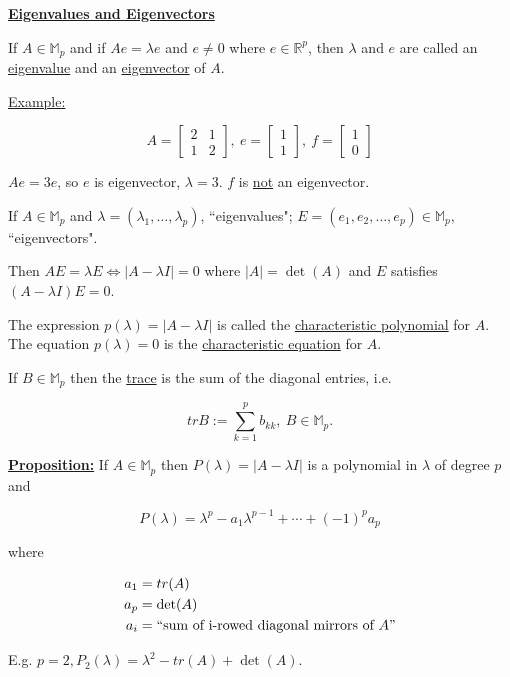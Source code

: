 \documentclass[twoside]{article}
\begin{document}
\textbf{\underline{Eigenvalues and Eigenvectors}}

If $A\in\mathbb{M}_p$ and if $Ae=\lambda e$ and $e\not=0$ where $e\in\mathbb{R}^p$, then $\lambda$ and $e$ are called an \underline{eigenvalue} and an \underline{eigenvector} of $A$.

\underline{Example:}

$$A=\begin{bmatrix}
	2 & 1\\
	1 & 2
\end{bmatrix},\ e=\begin{bmatrix}
	1\\
	1
\end{bmatrix},\ f=\begin{bmatrix}
	1\\
	0
\end{bmatrix}$$

$Ae=3e$, so $e$ is eigenvector, $\lambda=3$. $f$ is \underline{not} an eigenvector.

If $A\in\mathbb{M}_p$ and $\lambda=(\lambda_1,\dots, \lambda_p)$, ``eigenvalues"; $E=(e_1,e_2,\dots,e_p)\in\mathbb{M}_p$, ``eigenvectors".

Then $AE=\lambda E\iff \lvert A-\lambda I\rvert = 0$ where $|A|=\det(A)$ and $E$ satisfies $(A-\lambda I)E=0$.

The expression $p(\lambda)=\lvert A-\lambda I\rvert$ is called the \underline{characteristic polynomial} for $A$. The equation $p(\lambda)=0$ is the \underline{characteristic equation} for $A$.

If $B\in\mathbb{M}_p$ then the \underline{trace} is the sum of the diagonal entries, i.e.

$$tr{B}:=\sum^p_{k=1}b_{kk},\ B\in\mathbb{M}_p.$$

\textbf{\underline{Proposition:}} If $A\in\mathbb{M}_p$ then $P(\lambda)=\lvert A-\lambda I\rvert$ is a polynomial in $\lambda$ of degree $p$ and 

$$P(\lambda)=\lambda^p-a_1\lambda^{p-1}+\cdots +(-1)^p a_p$$

where

\begin{equation}
	\begin{split}
		a_1&=tr(A)\\
		a_p&=\det(A)\\
		a_i&=\text{``sum of i-rowed diagonal mirrors of } A" 
	\end{split}
\end{equation}

E.g. $p=2, P_2(\lambda)=\lambda^2-tr(A)+\det(A).$
\end{document}
